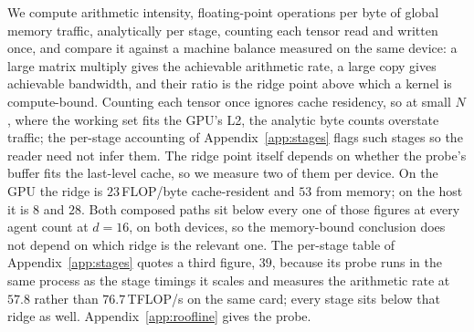 We compute arithmetic intensity, floating-point operations per byte of global
memory traffic, analytically per stage, counting each tensor read and written
once, and compare it against a machine balance measured on the same device: a
large matrix multiply gives the achievable arithmetic rate, a large copy gives
achievable bandwidth, and their ratio is the ridge point above which a kernel is
compute-bound. Counting each tensor once ignores cache residency, so at small
$N$, where the working set fits the GPU's L2, the analytic byte counts overstate
traffic; the per-stage accounting of Appendix~\ref{app:stages} flags such stages
so the reader need not infer them. The ridge point itself depends on whether the
probe's buffer fits the last-level cache, so we measure two of them per device.
On the GPU the ridge is $23$\,FLOP/byte cache-resident and $53$ from memory; on
the host it is $8$ and $28$. Both composed paths sit below every one of those figures at every agent count at $d{=}16$, on both devices, so the memory-bound
conclusion does not depend on which ridge is the relevant one. The per-stage
table of Appendix~\ref{app:stages} quotes a third figure, $39$, because its
probe runs in the same process as the stage timings it scales and measures the
arithmetic rate at $57.8$ rather than $76.7$\,TFLOP/s on the same card; every
stage sits below that ridge as well. Appendix~\ref{app:roofline} gives the
probe.
